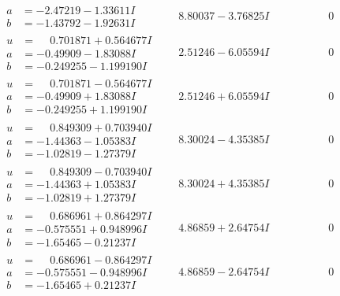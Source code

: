 \documentclass[1p]{elsarticle_modified}
\theoremstyle{definition}
\begin{document}
$$\begin{array}{c|c|c}
\begin{aligned}
a &= -2.47219 - 1.33611 I \\
b &= -1.43792 - 1.92631 I\end{aligned}
 & \phantom{-}8.80037 - 3.76825 I & \phantom{-0.000000 } 0 \\ \hline\begin{aligned}
u &= \phantom{-}0.701871 + 0.564677 I \\
a &= -0.49909 - 1.83088 I \\
b &= -0.249255 - 1.199190 I\end{aligned}
 & \phantom{-}2.51246 - 6.05594 I & \phantom{-0.000000 } 0 \\ \hline\begin{aligned}
u &= \phantom{-}0.701871 - 0.564677 I \\
a &= -0.49909 + 1.83088 I \\
b &= -0.249255 + 1.199190 I\end{aligned}
 & \phantom{-}2.51246 + 6.05594 I & \phantom{-0.000000 } 0 \\ \hline\begin{aligned}
u &= \phantom{-}0.849309 + 0.703940 I \\
a &= -1.44363 - 1.05383 I \\
b &= -1.02819 - 1.27379 I\end{aligned}
 & \phantom{-}8.30024 - 4.35385 I & \phantom{-0.000000 } 0 \\ \hline\begin{aligned}
u &= \phantom{-}0.849309 - 0.703940 I \\
a &= -1.44363 + 1.05383 I \\
b &= -1.02819 + 1.27379 I\end{aligned}
 & \phantom{-}8.30024 + 4.35385 I & \phantom{-0.000000 } 0 \\ \hline\begin{aligned}
u &= \phantom{-}0.686961 + 0.864297 I \\
a &= -0.575551 + 0.948996 I \\
b &= -1.65465 - 0.21237 I\end{aligned}
 & \phantom{-}4.86859 + 2.64754 I & \phantom{-0.000000 } 0 \\ \hline\begin{aligned}
u &= \phantom{-}0.686961 - 0.864297 I \\
a &= -0.575551 - 0.948996 I \\
b &= -1.65465 + 0.21237 I\end{aligned}
 & \phantom{-}4.86859 - 2.64754 I & \phantom{-0.000000 } 0\\

\end{array}$$
\end{document}
